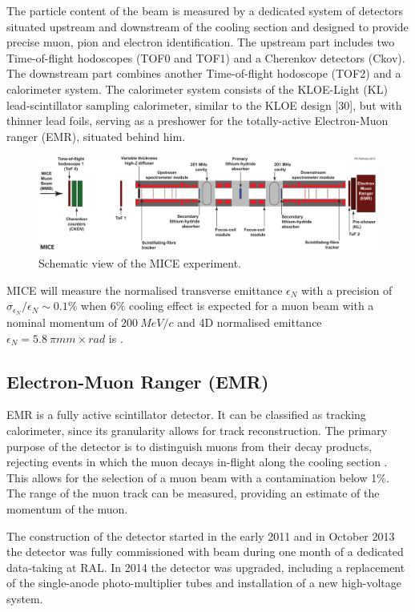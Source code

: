 \documentclass[a4paper,11pt]{article}
\begin{document}
The particle content of the beam is measured by a dedicated system of detectors situated upstream and downstream of the
cooling section and designed to provide precise muon, pion and electron identification. The upstream part includes two
Time-of-flight hodoscopes (TOF0 and TOF1) and a Cherenkov detectors (Ckov). The downstream part combines another 
Time-of-flight hodoscope (TOF2) and a calorimeter system. The calorimeter system consists of the KLOE-Light (KL)
lead-scintillator sampling calorimeter, similar to the KLOE design [30], but with thinner lead foils, serving
as a preshower for the totally-active Electron-Muon ranger (EMR), situated behind him.

\begin{figure}[h]
 \includegraphics[width=.95\textwidth]{./Cooling-demo.pdf}
 \caption{Schematic view of the MICE experiment.}
 \label{mice}
\end{figure}

MICE will measure the normalised transverse emittance $\epsilon_N$ with a precision of 
$\sigma_{\epsilon_N}/\epsilon_N \sim 0.1 \%$ when $6\%$ cooling effect is  expected for a muon beam with a nominal momentum
of $200 \ MeV/c$ and 4D normalised emittance $\epsilon_N = 5.8 \ \pi mm \times rad$ is .

\subsection{Electron-Muon Ranger (EMR)}
EMR is a fully active scintillator detector. It can be classified as tracking calorimeter, since its granularity allows for track reconstruction.
The primary purpose of the detector is to distinguish muons from their decay products, rejecting events in which the muon decays in-flight along
the cooling section \cite{ruslan}.  This allows for the selection of a muon beam with a contamination below 1\%.
The range of the muon track can be measured, providing an estimate of the momentum of the muon. 

The construction of the detector started in the early 2011 and in October 2013 the detector was fully commissioned with beam
during one month of a dedicated data-taking at RAL. In 2014 the detector was upgraded, including a replacement of the single-anode
photo-multiplier tubes and installation of a new high-voltage system.
\end{document}
